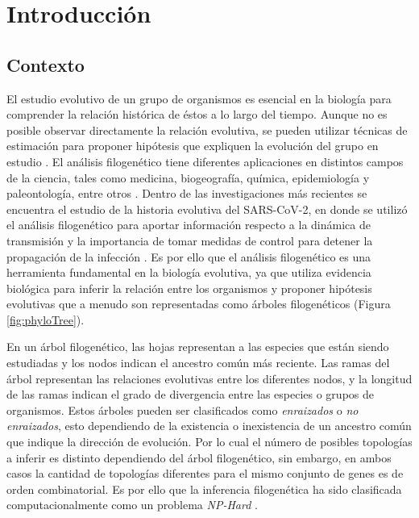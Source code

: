 \section{Introducción}
\label{cap:introduction}

\subsection{Contexto}
\label{sec:context}


El estudio evolutivo de un grupo de organismos es esencial en la biología para comprender la relación histórica de éstos a lo largo del tiempo. Aunque no es posible observar directamente la relación evolutiva, se pueden utilizar técnicas de estimación para proponer hipótesis que expliquen la evolución del grupo en estudio \citep{Warnow2017}. El análisis filogenético tiene diferentes aplicaciones en distintos campos de la ciencia, tales como medicina, biogeografía, química, epidemiología y paleontología, entre otros \citep{Morrison2012}. Dentro de las investigaciones más recientes se encuentra el estudio de la historia evolutiva del SARS-CoV-2, en donde se utilizó el análisis filogenético para aportar información respecto a la dinámica de transmisión y la importancia de tomar medidas de control para detener la propagación de la infección \citep{Castillo2020,Jaimes2020}. Es por ello que el análisis filogenético es una herramienta fundamental en la biología evolutiva, ya que utiliza evidencia biológica para inferir la relación entre los organismos y proponer hipótesis evolutivas que a menudo son representadas como árboles filogenéticos \citep{Carrio2018} (Figura \ref{fig:phyloTree}).

En un árbol filogenético, las hojas representan a las especies que están siendo estudiadas y los nodos indican el ancestro común más reciente. Las ramas del árbol representan las relaciones evolutivas entre los diferentes nodos, y la longitud de las ramas indican el grado de divergencia entre las especies o grupos de organismos. Estos árboles pueden ser clasificados como \textit{enraizados} o \textit{no enraizados}, esto dependiendo de la existencia o inexistencia de un ancestro común que indique la dirección de evolución. Por lo cual el número de posibles topologías a inferir es distinto dependiendo del árbol filogenético, sin embargo, en ambos casos la cantidad de topologías diferentes para el mismo conjunto de genes es de orden combinatorial. Es por ello que la inferencia filogenética ha sido clasificada computacionalmente como un problema \textit{NP-Hard} \citep{Felsenstein2004}.


